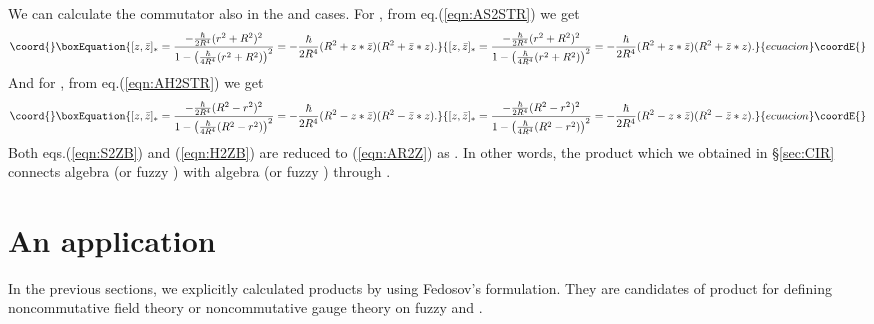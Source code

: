 \documentclass[12pt,a4paper]{article}
\def\h{\hbar}
\begin{document}
We can calculate the  commutator \myHighlight{$[z,{\bar z}]_*$}\coordHE{} also in the \coordHE{} and
\coordHE{} cases. 
For \coordHE{}, from eq.(\ref{eqn:AS2STR}) we get
\begin{equation}\coord{}\boxEquation{
\label{eqn:S2ZB}
[z,{\bar
  z}]_*={-{\h\over2R^4}(r^2+R^2)^2\over1-\left({\h\over4R^4}(r^2+R^2)\right)^2}=-{\h\over2R^4}(R^2+z*{\bar z})(R^2+{\bar z}*z).
}{
[z,{\bar
  z}]_*={-{\h\over2R^4}(r^2+R^2)^2\over1-\left({\h\over4R^4}(r^2+R^2)\right)^2}=-{\h\over2R^4}(R^2+z*{\bar z})(R^2+{\bar z}*z).
}{ecuacion}\coordE{}\end{equation}
And for \coordHE{}, from eq.(\ref{eqn:AH2STR}) we get
\begin{equation}\coord{}\boxEquation{
\label{eqn:H2ZB}
[z,{\bar
  z}]_*={-{\h\over2R^4}(R^2-r^2)^2\over1-\left({\h\over4R^4}(R^2-r^2)\right)^2}=-{\h\over2R^4}(R^2-z*{\bar z})(R^2-{\bar z}*z).
}{
[z,{\bar
  z}]_*={-{\h\over2R^4}(R^2-r^2)^2\over1-\left({\h\over4R^4}(R^2-r^2)\right)^2}=-{\h\over2R^4}(R^2-z*{\bar z})(R^2-{\bar z}*z).
}{ecuacion}\coordE{}\end{equation}
Both eqs.(\ref{eqn:S2ZB}) and (\ref{eqn:H2ZB}) are reduced to
  \myHighlight{$[z,{\bar   z}]_*=-{\h\over2}$}\coordHE{} (\ref{eqn:AR2Z}) as \coordHE{}.
In other words, the \myHighlight{$*$}\coordHE{} product which we obtained in \S\ref{sec:CIR}
connects \coordHE{} algebra (or fuzzy \coordHE{}) with \coordHE{} algebra (or
fuzzy \coordHE{}) through \coordHE{}.


\section{An application
\label{sec:APP}}

In the previous sections, we explicitly calculated \myHighlight{$*$}\coordHE{} products by
using Fedosov's formulation. They are candidates of \myHighlight{$*$}\coordHE{} product for
defining noncommutative field theory or noncommutative gauge theory on
fuzzy \coordHE{} and \coordHE{}. 
\end{document}
